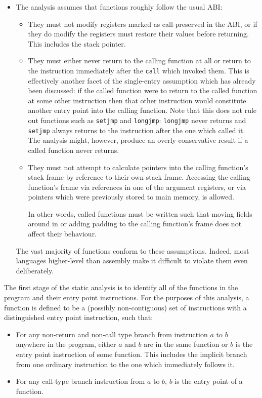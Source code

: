 \begin{itemize}
\item
  The analysis assumes that functions roughly follow the usual ABI:

  \begin{itemize}
  \item They must not modify registers marked as call-preserved in the
    ABI, or if they do modify the registers must restore their values
    before returning.  This includes the stack pointer.
  \item They must either never return to the calling function at all
    or return to the instruction immediately after the \verb|call|
    which invoked them.  This is effectively another facet of the
    single-entry assumption which has already been discussed: if the
    called function were to return to the called function at some
    other instruction then that other instruction would constitute
    another entry point into the calling function.  Note that this
    does not rule out functions such as \verb|setjmp| and
    \verb|longjmp|: \verb|longjmp| never returns and
    \verb|setjmp| always returns to the instruction after the one
    which called it.  The analysis might, however, produce an
    overly-conservative result if a called function never returns.
  \item They must not attempt to calculate pointers into the calling
    function's stack frame by reference to their own stack frame.
    Accessing the calling function's frame via references in one of
    the argument registers, or via pointers which were previously
    stored to main memory, is allowed.

    In other words, called functions must be written such that moving
    fields around in or adding padding to the calling function's frame
    does not affect their behaviour.
  \end{itemize}

  The vast majority of functions conform to these assumptions.
  Indeed, most languages higher-level than assembly make it difficult
  to violate them even deliberately.
\end{itemize}

The first stage of the static analysis is to identify all of the
functions in the program and their entry point instructions.  For the
purposes of this analysis, a function is defined to be a (possibly
non-contiguous) set of instructions with a distinguished entry point
instruction, such that:

\begin{itemize}
\item
  For any non-return and non-call type branch from instruction $a$ to
  $b$ anywhere in the program, either $a$ and $b$ are in the same
  function or $b$ is the entry point instruction of some function.
  This includes the implicit branch from one ordinary instruction to
  the one which immediately follows it.
\item
  For any call-type branch instruction from $a$ to $b$, $b$ is the
  entry point of a function.
\end{itemize}

